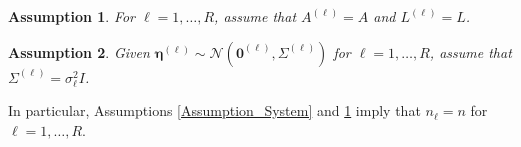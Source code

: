 \documentclass[12pt]{article}
\newcommand{\trans}[1]{{#1}^\mathsf{T}}	%
\DeclareMathOperator{\diag}{diag}	%
\DeclareMathOperator{\rank}{rank}	%
\newcommand{\noise}{\eta}	%
\newcommand{\noiseSD}{\sigma}	%
\newcommand{\noiseVec}{\bm{\noise}}	%
\newcommand{\zeroVec}{\bm{0}}	%
\newtheorem{assumption}{Assumption}
\begin{document}
\begin{assumption}
\label{Assumption_Matrices}
For $\ell = 1,\ldots,R$, assume that $A^{(\ell)} = A$ and $L^{(\ell)} = L$.
\end{assumption}  

\begin{assumption}
\label{Assumption_Noise}
Given $\noiseVec^{(\ell)} \sim \mathcal{N}(\zeroVec^{(\ell)},\Sigma^{(\ell)})$ for $\ell = 1,\ldots,R$, assume that $\Sigma^{(\ell)} = \noiseSD_\ell^2I$.
\end{assumption}
\noindent In particular, Assumptions \ref{Assumption_System} and \ref{Assumption_Matrices} imply that $n_\ell = n$ for $\ell = 1,\ldots,R$.

\end{document}
